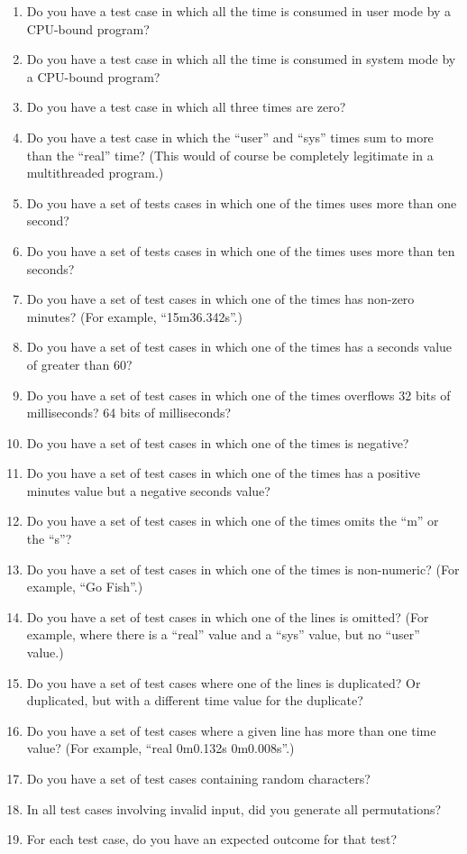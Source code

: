 {	\begin{enumerate}
	\item	Do you have a test case in which all the time is
		consumed in user mode by a CPU-bound program?
	\item	Do you have a test case in which all the time is
		consumed in system mode by a CPU-bound program?
	\item	Do you have a test case in which all three times
		are zero?
	\item	Do you have a test case in which the ``user'' and ``sys''
		times sum to more than the ``real'' time?
		(This would of course be completely legitimate in
		a multithreaded program.)
	\item	Do you have a set of tests cases in which one of the
		times uses more than one second?
	\item	Do you have a set of tests cases in which one of the
		times uses more than ten seconds?
	\item	Do you have a set of test cases in which one of the
		times has non-zero minutes?  (For example, ``15m36.342s''.)
	\item	Do you have a set of test cases in which one of the
		times has a seconds value of greater than 60?
	\item	Do you have a set of test cases in which one of the
		times overflows 32 bits of milliseconds?  64 bits of
		milliseconds?
	\item	Do you have a set of test cases in which one of the
		times is negative?
	\item	Do you have a set of test cases in which one of the
		times has a positive minutes value but a negative
		seconds value?
	\item	Do you have a set of test cases in which one of the
		times omits the ``m'' or the ``s''?
	\item	Do you have a set of test cases in which one of the
		times is non-numeric?  (For example, ``Go Fish''.)
	\item	Do you have a set of test cases in which one of the
		lines is omitted?  (For example, where there is a
		``real'' value and a ``sys'' value, but no ``user''
		value.)
	\item	Do you have a set of test cases where one of the
		lines is duplicated?  Or duplicated, but with a
		different time value for the duplicate?
	\item	Do you have a set of test cases where a given line
		has more than one time value?  (For example,
		``real 0m0.132s 0m0.008s''.)
	\item	Do you have a set of test cases containing random
		characters?
	\item	In all test cases involving invalid input, did you
		generate all permutations?
	\item	For each test case, do you have an expected outcome
		for that test?
	\end{enumerate}

}
